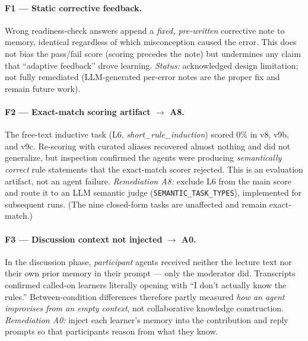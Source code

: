 \documentclass[11pt]{article}
\begin{document}
\paragraph{F1 --- Static corrective feedback.}
Wrong readiness-check answers append a \emph{fixed, pre-written} corrective note to
memory, identical regardless of which misconception caused the error.  This does not
bias the pass/fail score (scoring precedes the note) but undermines any claim that
``adaptive feedback'' drove learning.  \emph{Status:} acknowledged design limitation;
not fully remediated (LLM-generated per-error notes are the proper fix and remain
future work).

\paragraph{F2 --- Exact-match scoring artifact $\to$ A8.}
The free-text inductive task (L6, \emph{short\_rule\_induction}) scored 0\% in v8,
v9b, and v9c.  Re-scoring with curated aliases recovered almost nothing and did not
generalize, but inspection confirmed the agents were producing \emph{semantically
correct} rule statements that the exact-match scorer rejected.  This is an evaluation
artifact, not an agent failure.  \emph{Remediation A8:} exclude L6 from the main
score and route it to an LLM semantic judge (\texttt{SEMANTIC\_TASK\_TYPES}),
implemented for subsequent runs.  (The nine closed-form tasks are unaffected and
remain exact-match.)

\paragraph{F3 --- Discussion context not injected $\to$ A0.}
In the discussion phase, \emph{participant} agents received neither the lecture text
nor their own prior memory in their prompt --- only the moderator did.  Transcripts
confirmed called-on learners literally opening with ``I don't actually know the
rules.''  Between-condition differences therefore partly measured \emph{how an agent
improvises from an empty context}, not collaborative knowledge construction.
\emph{Remediation A0:} inject each learner's memory into the contribution and reply
prompts so that participants reason from what they know.
\end{document}
